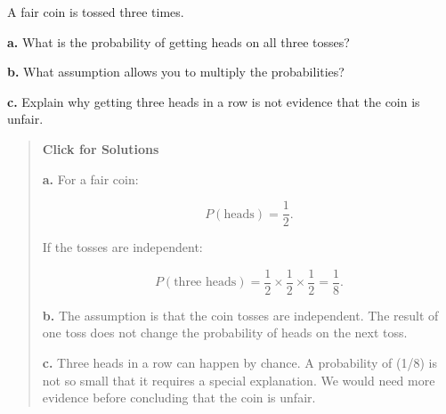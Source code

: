 \documentclass[
  letterpaper,
  DIV=11,
  numbers=noendperiod]{scrreprt}
\begin{document}
\begin{tcolorbox}[enhanced jigsaw, arc=.35mm, bottomrule=.15mm, bottomtitle=1mm, breakable, colback=white, colbacktitle=quarto-callout-note-color!10!white, colframe=quarto-callout-note-color-frame, coltitle=black, left=2mm, leftrule=.75mm, opacityback=0, opacitybacktitle=0.6, rightrule=.15mm, title=\textcolor{quarto-callout-note-color}{\faInfo}\hspace{0.5em}{Question 10}, titlerule=0mm, toprule=.15mm, toptitle=1mm]

A fair coin is tossed three times.

\textbf{a.} What is the probability of getting heads on all three
tosses?

\textbf{b.} What assumption allows you to multiply the probabilities?

\textbf{c.} Explain why getting three heads in a row is not evidence
that the coin is unfair.

\begin{quote}
\textbf{Click for Solutions}

\textbf{a.} For a fair coin:

\[P(\text{heads}) = \frac{1}{2}.\]

If the tosses are independent:

\[P(\text{three heads}) = \frac{1}{2} \times \frac{1}{2} \times \frac{1}{2} = \frac{1}{8}.\]

\textbf{b.} The assumption is that the coin tosses are independent. The
result of one toss does not change the probability of heads on the next
toss.

\textbf{c.} Three heads in a row can happen by chance. A probability of
(1/8) is not so small that it requires a special explanation. We would
need more evidence before concluding that the coin is unfair.
\end{quote}

\end{tcolorbox}
\end{document}
